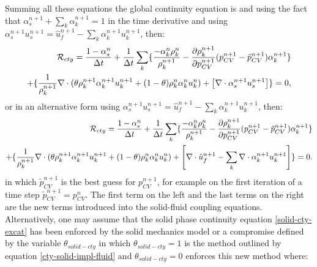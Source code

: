 Summing all these equations the global continuity equation is and using the fact that $ \alpha_s^{n+1}+\sum_k\alpha_k^{n+1}=1$ in the time
derivative and using $\alpha_s^{n+1} u_s^{n+1}=\hat u_f^{n+1} - \sum_k\alpha_k^{n+1} u_k^{n+1}$, then:
\begin{eqnarray}
{\cal{R}}_{cty} =\frac{1-\alpha_s^n}{\Delta t} +
\frac{1}{\Delta t} \sum_k\{
\frac{  - \alpha_k^n\rho_k^{n}} {\rho_k^{n+1}}
-  \frac{\partial \rho_k^{n+1}}{\partial p_{CV}^{n+1}} (p_{CV}^{n+1}-\tilde{p}_{CV}^{n+1}) \alpha_k^{n+1} \}
\\
+
\{
\frac{1}{\rho_k^{n+1} } \nabla\cdot (\theta \rho_k^{n+1} \alpha_k^{n+1} u_k^{n+1}+(1-\theta) \rho_k^{n} \alpha_k^{n} u_k^{n})
+\left[ \nabla\cdot\alpha_s^{n+1} u_s^{n+1} \right] \}
=0,
\end{eqnarray}
or in an alternative form using $\alpha_s^{n+1} u_s^{n+1}=\hat u_f^{n+1} - \sum_k\alpha_k^{n+1} u_k^{n+1}$, then:
\begin{eqnarray}
{\cal{R}}_{cty} =\frac{1-\alpha_s^n}{\Delta t} +
\frac{1}{\Delta t} \sum_k\{
\frac{  - \alpha_k^n\rho_k^{n}} {\rho_k^{n+1}}
-  \frac{\partial \rho_k^{n+1}}{\partial p_{CV}^{n+1}} (p_{CV}^{n+1}-\tilde{p}_{CV}^{n+1}) \alpha_k^{n+1} \}
\\
+
\{
\frac{1}{\rho_k^{n+1} } \nabla\cdot (\theta \rho_k^{n+1} \alpha_k^{n+1} u_k^{n+1}+(1-\theta) \rho_k^{n} \alpha_k^{n} u_k^{n})
+\left[ \nabla\cdot\hat u_f^{n+1} - \sum_k \nabla\cdot \alpha_k^{n+1} u_k^{n+1} \right] \}
=0.
\label{cty-solid-impl-fluid}
\end{eqnarray}
in which $\tilde{p}_{CV}^{n+1}$ is the best guess for ${p}_{CV}^{n+1}$, for example on the first iteration of a
time step  $\tilde{p}_{CV}^{n+1} ={p}_{CV}^{n}$.
The first term on the left and the last terms on the right are the new terms introduced into the solid-fluid coupling equations.
Alternatively, one may assume that the solid phase continuity equation \ref{solid-cty-excat}  has been enforced
by the solid mechanics model or a compromise defined by the variable $\theta_{solid-cty}$ in which
$\theta_{solid-cty}=1$ is the method outlined by equation \ref{cty-solid-impl-fluid} and $\theta_{solid-cty}=0$
enforces this new method where:

